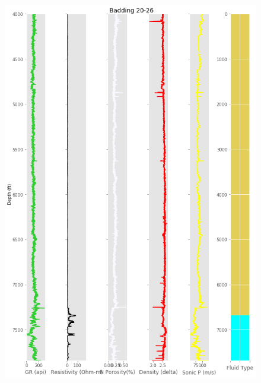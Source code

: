 \documentclass[11pt, a4paper]{article}
\begin{document}
\begin{figure}[h!]
  \includegraphics[width=\linewidth]{w4}
\end{figure}
\end{document}
